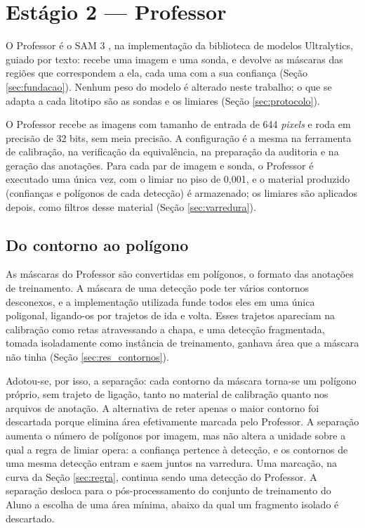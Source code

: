 \section{Estágio 2 --- Professor}
\label{sec:professor}

O Professor é o SAM 3 \cite{sam3_carion2026}, na implementação da biblioteca de modelos Ultralytics, guiado por texto: recebe uma imagem e uma sonda, e devolve as máscaras das regiões que correspondem a ela, cada uma com a sua confiança (Seção \ref{sec:fundacao}). Nenhum peso do modelo é alterado neste trabalho; o que se adapta a cada litotipo são as sondas e os limiares (Seção \ref{sec:protocolo}).

O Professor recebe as imagens com tamanho de entrada de 644 \textit{pixels} e roda em precisão de 32 bits, sem meia precisão. A configuração é a mesma na ferramenta de calibração, na verificação da equivalência, na preparação da auditoria e na geração das anotações. Para cada par de imagem e sonda, o Professor é executado uma única vez, com o limiar no piso de 0,001, e o material produzido (confianças e polígonos de cada detecção) é armazenado; os limiares são aplicados depois, como filtros desse material (Seção \ref{sec:varredura}).

\subsection{Do contorno ao polígono}
\label{sec:poligonos}

As máscaras do Professor são convertidas em polígonos, o formato das anotações de treinamento. A máscara de uma detecção pode ter vários contornos desconexos, e a implementação utilizada funde todos eles em uma única poligonal, ligando-os por trajetos de ida e volta. Esses trajetos apareciam na calibração como retas atravessando a chapa, e uma detecção fragmentada, tomada isoladamente como instância de treinamento, ganhava área que a máscara não tinha (Seção \ref{sec:res_contornos}).

Adotou-se, por isso, a separação: cada contorno da máscara torna-se um polígono próprio, sem trajeto de ligação, tanto no material de calibração quanto nos arquivos de anotação. A alternativa de reter apenas o maior contorno foi descartada porque elimina área efetivamente marcada pelo Professor. A separação aumenta o número de polígonos por imagem, mas não altera a unidade sobre a qual a regra de limiar opera: a confiança pertence à detecção, e os contornos de uma mesma detecção entram e saem juntos na varredura. Uma marcação, na curva da Seção \ref{sec:regra}, continua sendo uma detecção do Professor. A separação desloca para o pós-processamento do conjunto de treinamento do Aluno a escolha de uma área mínima, abaixo da qual um fragmento isolado é descartado.

